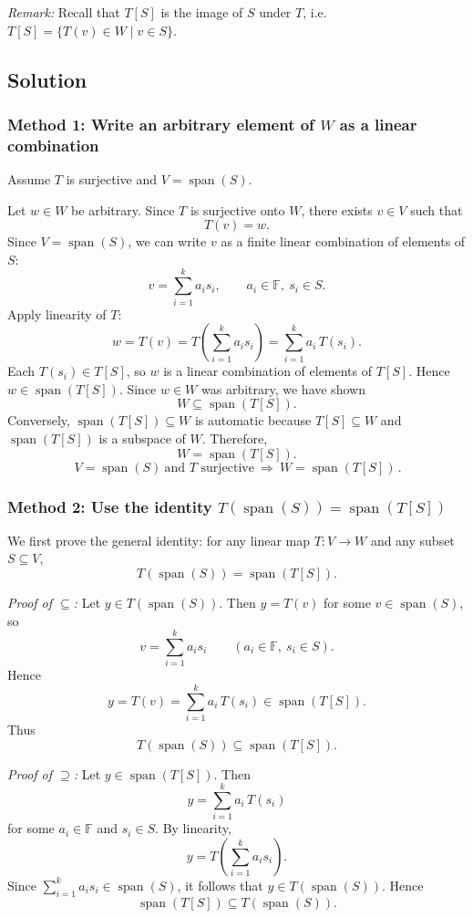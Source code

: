 \documentclass[12pt]{article}
\begin{document}
\medskip
\noindent\textit{Remark:} Recall that $T[S]$ is the image of $S$ under $T$, i.e.\ $T[S]=\{T(v)\in W\mid v\in S\}$.

\subsection{Solution}

\subsubsection{Method 1: Write an arbitrary element of $W$ as a linear combination}
Assume $T$ is surjective and $V=\operatorname{span}(S)$.

Let $w\in W$ be arbitrary. Since $T$ is surjective onto $W$, there exists $v\in V$ such that
\[
T(v)=w.
\]
Since $V=\operatorname{span}(S)$, we can write $v$ as a finite linear combination of elements of $S$:
\[
v=\sum_{i=1}^k a_i s_i,\qquad a_i\in\mathbb{F},\ s_i\in S.
\]
Apply linearity of $T$:
\[
w=T(v)=T\!\left(\sum_{i=1}^k a_i s_i\right)=\sum_{i=1}^k a_i\,T(s_i).
\]
Each $T(s_i)\in T[S]$, so $w$ is a linear combination of elements of $T[S]$. Hence $w\in\operatorname{span}(T[S])$.
Since $w\in W$ was arbitrary, we have shown
\[
W\subseteq \operatorname{span}(T[S]).
\]
Conversely, $\operatorname{span}(T[S])\subseteq W$ is automatic because $T[S]\subseteq W$ and $\operatorname{span}(T[S])$ is a subspace of $W$.
Therefore,
\[
W=\operatorname{span}(T[S]).
\]
\[
\boxed{\,V=\operatorname{span}(S)\ \text{and $T$ surjective}\ \Longrightarrow\ W=\operatorname{span}(T[S])\,}.
\]

\subsubsection{Method 2: Use the identity $T(\operatorname{span}(S))=\operatorname{span}(T[S])$}
We first prove the general identity: for any linear map $T:V\to W$ and any subset $S\subseteq V$,
\[
T(\operatorname{span}(S))=\operatorname{span}(T[S]).
\]

\emph{Proof of $\subseteq$:} Let $y\in T(\operatorname{span}(S))$. Then $y=T(v)$ for some $v\in\operatorname{span}(S)$, so
\[
v=\sum_{i=1}^k a_i s_i\qquad (a_i\in\mathbb{F},\ s_i\in S).
\]
Hence
\[
y=T(v)=\sum_{i=1}^k a_i\,T(s_i)\in \operatorname{span}(T[S]).
\]
Thus
\[
T(\operatorname{span}(S))\subseteq \operatorname{span}(T[S]).
\]

\emph{Proof of $\supseteq$:} Let $y\in\operatorname{span}(T[S])$. Then
\[
y=\sum_{i=1}^k a_i\,T(s_i)
\]
for some $a_i\in\mathbb{F}$ and $s_i\in S$. By linearity,
\[
y=T\!\left(\sum_{i=1}^k a_i s_i\right).
\]
Since $\sum_{i=1}^k a_i s_i\in\operatorname{span}(S)$, it follows that $y\in T(\operatorname{span}(S))$. Hence
\[
\operatorname{span}(T[S])\subseteq T(\operatorname{span}(S)).
\]
\end{document}
